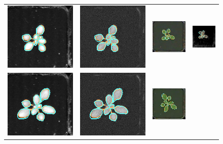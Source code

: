 \begin{figure}
\begin{centering}
\begin{tabular}{cccc}
\includegraphics[width=.18\textwidth]{Figures/LabelAlignment/day_3_hour_23-seg_ir.png}&
\includegraphics[width=.18\textwidth]{Figures/LabelAlignment/day_3_hour_23-seg_fmp.png}&
\includegraphics[width=.18\textwidth]{Figures/LabelAlignment/day_3_hour_23-seg_rgb.png}&
\includegraphics[width=.18\textwidth]{Figures/LabelAlignment/day_3_hour_23-seg_depth.png}\\
\includegraphics[width=.18\textwidth]{Figures/LabelAlignment/day_5_hour_23-seg_ir.png}&
\includegraphics[width=.18\textwidth]{Figures/LabelAlignment/day_5_hour_23-seg_fmp.png}&
\includegraphics[width=.18\textwidth]{Figures/LabelAlignment/day_5_hour_23-seg_rgb.png}&

\end{tabular}
\end{centering}
\end{figure}
